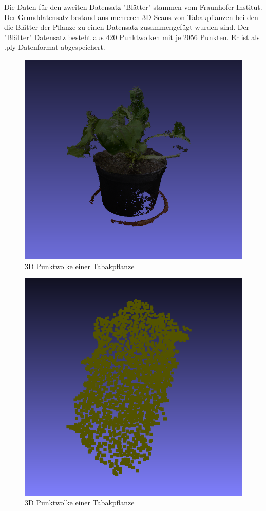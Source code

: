 \documentclass{llncs}
\begin{document}
 Die Daten für den zweiten Datensatz "Blätter" stammen vom Fraunhofer Institut. Der Grunddatensatz bestand aus mehreren 3D-Scans von Tabakpflanzen bei den die Blätter der Pflanze zu einen Datensatz zusammengefügt wurden sind. Der "Blätter" Datensatz besteht aus 420 Punktwolken mit je 2056 Punkten. Er ist als .ply Datenformat abgespeichert.
\begin{figure}[htbp] 
	\centering
	\includegraphics[width=1.2\textwidth]{plant.png}
	\caption{3D Punktwolke einer Tabakpflanze}
	\label{fig:Bild2}
\end{figure}

\begin{figure}[htbp] 
	\centering
	\includegraphics[width=1.2\textwidth]{leaf1.png}
	\caption{3D Punktwolke einer Tabakpflanze}
	\label{fig:Bild2}
\end{figure}
\end{document}
